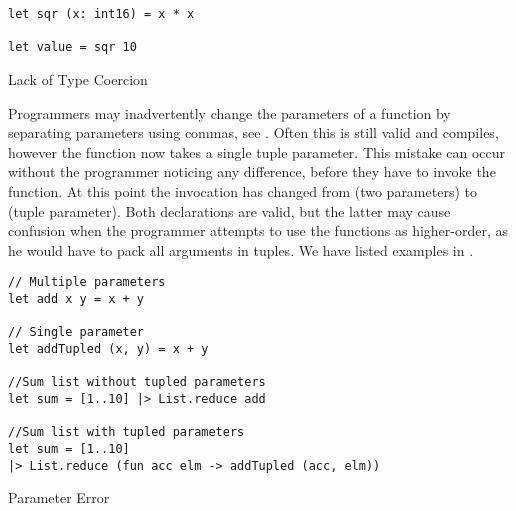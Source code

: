 \begin{listing}[H]
\begin{verbatim}
let sqr (x: int16) = x * x

let value = sqr 10
\end{verbatim}
\caption{Lack of Type Coercion}
\label{lst:coer-lack}
\end{listing}

Programmers may inadvertently change the parameters of a function by separating parameters using commas, see . Often this is still valid \fs and compiles, however the function now takes a single tuple parameter. This mistake can occur without the programmer noticing any difference, before they have to invoke the function. At this point the invocation has changed from (two parameters) to (tuple parameter). Both declarations are valid, but the latter may cause confusion when the programmer attempts to use the functions as higher-order, as he would have to pack all arguments in tuples. We have listed examples in .

\begin{listing}[H]
\begin{verbatim}
// Multiple parameters
let add x y = x + y

// Single parameter
let addTupled (x, y) = x + y

//Sum list without tupled parameters
let sum = [1..10] |> List.reduce add

//Sum list with tupled parameters
let sum = [1..10] 
|> List.reduce (fun acc elm -> addTupled (acc, elm)) 
\end{verbatim}
\caption{Parameter Error}
\label{lst:para-err}
\end{listing}
